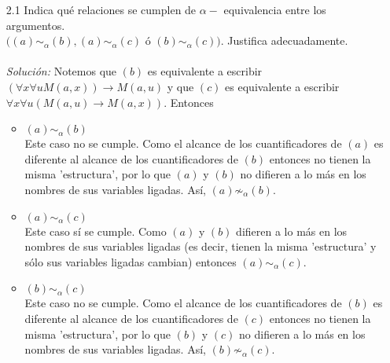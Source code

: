 \documentclass[letterpaper,11pt]{article}
\begin{document}
\begin{enumerate}
\begin{itemize}
            \begin{enumerate}
                \item[2.1] Indica qué relaciones se cumplen de $\alpha-$
                equivalencia entre los argumentos. \\
                $((a) \sim_{\alpha} (b), (a) \sim_{\alpha} (c)$ ó 
                $(b) \sim_{\alpha} (c))$. Justifica adecuadamente. \\ \\
                \textit{Solución:} Notemos que $(b)$ es equivalente a escribir 
                $(\forall x \forall u M(a,x)) \rightarrow M(a,u)$ y que $(c)$
                es equivalente a escribir $\forall x \forall u (M(a,u) 
                \rightarrow M(a,x))$. Entonces
                
                \begin{itemize}
                    \item $(a) \sim_{\alpha} (b)$ \\
                    Este caso no se cumple. Como el alcance de los 
                    cuantificadores de $(a)$ es diferente al alcance de los
                    cuantificadores de $(b)$ entonces no tienen la misma 
                    'estructura', por lo que $(a)$ y $(b)$ no difieren a lo
                    más en los nombres de sus variables ligadas. Así, 
                    $(a) \not \sim_{\alpha} (b)$.

                    \item $(a) \sim_{\alpha} (c)$ \\
                    Este caso sí se cumple. Como $(a)$ y $(b)$ difieren a lo 
                    más en los nombres de sus variables ligadas (es decir,
                    tienen la misma 'estructura' y sólo sus variables 
                    ligadas cambian) entonces $(a) \sim_{\alpha} (c)$.

                    \item $(b) \sim_{\alpha} (c)$ \\
                    Este caso no se cumple.  Como el alcance de los 
                    cuantificadores de $(b)$ es diferente al alcance de los
                    cuantificadores de $(c)$ entonces no tienen la misma 
                    'estructura', por lo que $(b)$ y $(c)$ no difieren a lo
                    más en los nombres de sus variables ligadas. Así, 
                    $(b) \not \sim_{\alpha} (c)$.
                \end{itemize}


\end{enumerate}
\end{itemize}
\end{enumerate}
\end{document}
